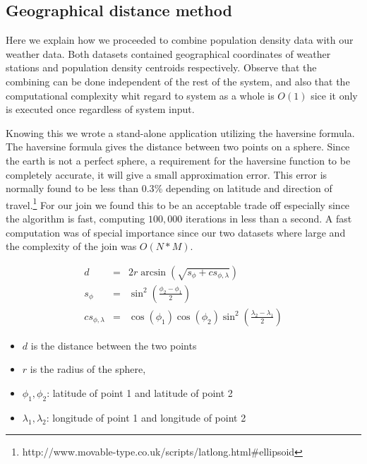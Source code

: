 \documentclass[
10pt, %
a4paper, %
oneside, %
headinclude,footinclude, %
useAMS,
usenatbib
]{template/mn2e}  %
\begin{document}
\subsection{Geographical distance method}
Here we explain how we proceeded to combine population density data with our weather data.
Both datasets contained geographical coordinates of weather stations and population density centroids respectively. Observe that the combining can be done independent of the rest of the system, and also that the computational complexity whit regard to system as a whole is $O(1)$ sice it only is executed once regardless of system input.

Knowing this we wrote a stand-alone application utilizing the haversine formula. The haversine formula gives the distance between two points on a sphere. Since the earth is not a perfect sphere, a requirement for the haversine function to be completely accurate, it will give a small approximation error. This error is normally found to be less than $0.3$\% depending on latitude and direction of travel.\footnote{http://www.movable-type.co.uk/scripts/latlong.html\#ellipsoid}
For our join we found this to be an acceptable trade off especially since the algorithm is fast, computing $100,000$ iterations in less than a second. A fast computation was of special importance since our two datasets where large and the complexity of the join was $O(N*M)$.

\begin{eqnarray}
 d &=& 2r\arcsin\left(\sqrt{s_\phi + cs_{\phi,\lambda}}\right)\\
 s_\phi &=& \sin^2\left(\frac{\phi_2-\phi_1}{2}\right)\\
 cs_{\phi,\lambda} &=& \cos(\phi_1)\cos(\phi_2)\sin^2\left(\frac{\lambda_2-\lambda_1}{2}\right)
\end{eqnarray}

\begin{itemize}
\item $d$ is the distance between the two points
\item $r$ is the radius of the sphere,
\item $\phi_1, \phi_2 $: latitude of point 1 and latitude of point 2
\item $\lambda_1, \lambda_2$: longitude of point 1 and longitude of point 2
\end{itemize}
\end{document}
